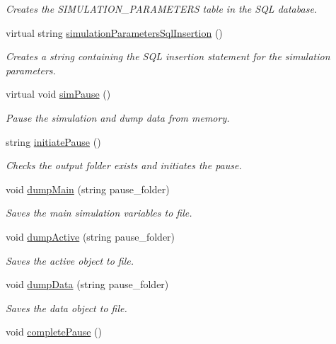\begin{DoxyCompactItemize}
\begin{DoxyCompactList}\small\item\em Creates the S\+I\+M\+U\+L\+A\+T\+I\+O\+N\+\_\+\+P\+A\+R\+A\+M\+E\+T\+E\+RS table in the S\+QL database. \end{DoxyCompactList}\item 
virtual string \hyperlink{class_tree_aed6504b4f759fb31fdeb61cd03b2b3f9}{simulation\+Parameters\+Sql\+Insertion} ()
\begin{DoxyCompactList}\small\item\em Creates a string containing the S\+QL insertion statement for the simulation parameters. \end{DoxyCompactList}\item 
virtual void \hyperlink{class_tree_ae5308f74e982485ac444aa394b952152}{sim\+Pause} ()\hypertarget{class_tree_ae5308f74e982485ac444aa394b952152}{}\label{class_tree_ae5308f74e982485ac444aa394b952152}

\begin{DoxyCompactList}\small\item\em Pause the simulation and dump data from memory. \end{DoxyCompactList}\item 
string \hyperlink{class_tree_a9b2df7fd1b61d3d70ac630f7fbfd683d}{initiate\+Pause} ()\hypertarget{class_tree_a9b2df7fd1b61d3d70ac630f7fbfd683d}{}\label{class_tree_a9b2df7fd1b61d3d70ac630f7fbfd683d}

\begin{DoxyCompactList}\small\item\em Checks the output folder exists and initiates the pause. \end{DoxyCompactList}\item 
void \hyperlink{class_tree_a4c2988184328a5236ca61f16744cfac2}{dump\+Main} (string pause\+\_\+folder)
\begin{DoxyCompactList}\small\item\em Saves the main simulation variables to file. \end{DoxyCompactList}\item 
void \hyperlink{class_tree_aca99503f49b91baae7401423fe547daf}{dump\+Active} (string pause\+\_\+folder)
\begin{DoxyCompactList}\small\item\em Saves the active object to file. \end{DoxyCompactList}\item 
void \hyperlink{class_tree_acd23fa139c7d097315c9479187b1a674}{dump\+Data} (string pause\+\_\+folder)
\begin{DoxyCompactList}\small\item\em Saves the data object to file. \end{DoxyCompactList}\item 
void \hyperlink{class_tree_a3fddb18a5d19b64dec378dca3d3fea31}{complete\+Pause} ()\hypertarget{class_tree_a3fddb18a5d19b64dec378dca3d3fea31}{}\label{class_tree_a3fddb18a5d19b64dec378dca3d3fea31}


\end{DoxyCompactItemize}
